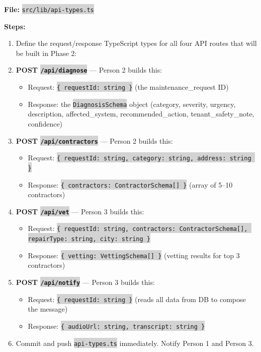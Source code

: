 \documentclass[11pt, a4paper]{article}
\newcommand{\code}[1]{\texttt{\small\colorbox{lightgray}{#1}}}
\begin{document}
\vspace{0.3em}

\textbf{File:} \code{src/lib/api-types.ts}

\textbf{Steps:}
\begin{enumerate}[leftmargin=2em, itemsep=2pt]
  \item Define the request/response TypeScript types for all four API routes that will be built in Phase 2:

  \item \textbf{POST \code{/api/diagnose}} --- Person 2 builds this:
    \begin{itemize}[itemsep=1pt]
      \item Request: \code{\{ requestId: string \}} (the maintenance\_request ID)
      \item Response: the \code{DiagnosisSchema} object (category, severity, urgency, description, affected\_system, recommended\_action, tenant\_safety\_note, confidence)
    \end{itemize}

  \item \textbf{POST \code{/api/contractors}} --- Person 2 builds this:
    \begin{itemize}[itemsep=1pt]
      \item Request: \code{\{ requestId: string, category: string, address: string \}}
      \item Response: \code{\{ contractors: ContractorSchema[] \}} (array of 5--10 contractors)
    \end{itemize}

  \item \textbf{POST \code{/api/vet}} --- Person 3 builds this:
    \begin{itemize}[itemsep=1pt]
      \item Request: \code{\{ requestId: string, contractors: ContractorSchema[], repairType: string, city: string \}}
      \item Response: \code{\{ vetting: VettingSchema[] \}} (vetting results for top 3 contractors)
    \end{itemize}

  \item \textbf{POST \code{/api/notify}} --- Person 3 builds this:
    \begin{itemize}[itemsep=1pt]
      \item Request: \code{\{ requestId: string \}} (reads all data from DB to compose the message)
      \item Response: \code{\{ audioUrl: string, transcript: string \}}
    \end{itemize}

  \item Commit and push \code{api-types.ts} immediately. Notify Person 1 and Person 3.
\end{enumerate}
\end{document}
